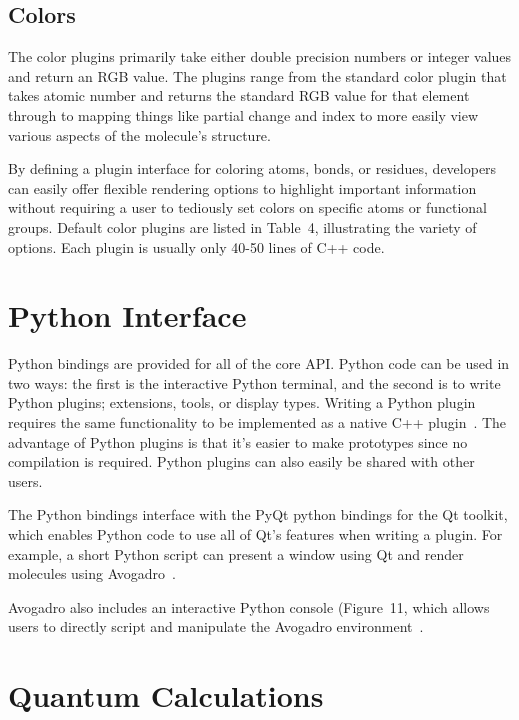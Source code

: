\documentclass[10pt]{bmc_article}
\newenvironment{bmcformat}{\begin{raggedright}
  \baselineskip20pt\sloppy\setboolean{publ}{false}}{\end{raggedright}
  \baselineskip20pt\sloppy}
\begin{document}
\begin{bmcformat}
\subsection*{Colors}

The color plugins primarily take either double precision numbers or integer
values and return an RGB value. The plugins range from the standard color
plugin that takes atomic number and returns the standard RGB value for that
element through to mapping things like partial change and index to more easily
view various aspects of the molecule's structure.

By defining a plugin interface for coloring atoms, bonds, or residues,
developers can easily offer flexible rendering options to highlight
important information without requiring a user to tediously set colors
on specific atoms or functional groups. Default color plugins are
listed in Table~4, illustrating the variety of
options. Each plugin is usually only 40-50 lines of C++ code.

\section*{Python Interface}

Python bindings are provided for all of the core API. Python code can be used
in two ways: the first is the interactive Python terminal, and the second is to
write Python plugins; extensions, tools, or display types.
Writing a Python plugin requires the same functionality to be implemented as a
native C++ plugin~\cite{PythonExtensions}. The advantage of Python
plugins is that it's easier to make prototypes since no compilation is
required. Python plugins can also easily be shared with other users.

The Python bindings interface with the PyQt python bindings for the Qt
toolkit, which enables Python code to use all of Qt's features when writing a
plugin. For example, a short Python script can present a window using Qt and
render molecules using Avogadro~\cite{PythonWindowExample,PythonScripting,PyQtGist}.

Avogadro also includes an interactive Python console
(Figure~11, which allows users to directly script
and manipulate the Avogadro environment~\cite{PythonTerminalTutorial}.


\section*{Quantum Calculations} %


\end{bmcformat}
\end{document}
